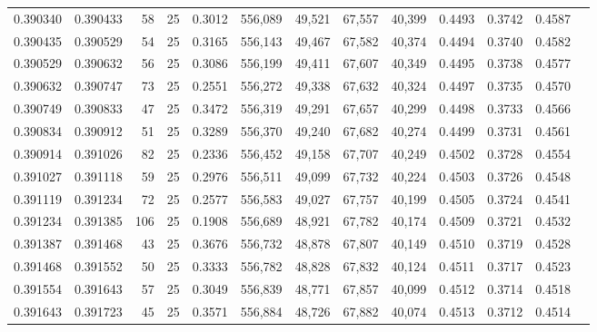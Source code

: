 \begin{tabular}{rrrrrrrrrrrrr}
0.390340 & 0.390433 &    58 &  25 &                                     0.3012 & 556,089 &  49,521 &  67,557 &  40,399 & 0.4493 & 0.3742 & 0.4587 \\
0.390435 & 0.390529 &    54 &  25 &                                     0.3165 & 556,143 &  49,467 &  67,582 &  40,374 & 0.4494 & 0.3740 & 0.4582 \\
0.390529 & 0.390632 &    56 &  25 &                                     0.3086 & 556,199 &  49,411 &  67,607 &  40,349 & 0.4495 & 0.3738 & 0.4577 \\
0.390632 & 0.390747 &    73 &  25 &                                     0.2551 & 556,272 &  49,338 &  67,632 &  40,324 & 0.4497 & 0.3735 & 0.4570 \\
0.390749 & 0.390833 &    47 &  25 &                                     0.3472 & 556,319 &  49,291 &  67,657 &  40,299 & 0.4498 & 0.3733 & 0.4566 \\
0.390834 & 0.390912 &    51 &  25 &                                     0.3289 & 556,370 &  49,240 &  67,682 &  40,274 & 0.4499 & 0.3731 & 0.4561 \\
0.390914 & 0.391026 &    82 &  25 &                                     0.2336 & 556,452 &  49,158 &  67,707 &  40,249 & 0.4502 & 0.3728 & 0.4554 \\
0.391027 & 0.391118 &    59 &  25 &                                     0.2976 & 556,511 &  49,099 &  67,732 &  40,224 & 0.4503 & 0.3726 & 0.4548 \\
0.391119 & 0.391234 &    72 &  25 &                                     0.2577 & 556,583 &  49,027 &  67,757 &  40,199 & 0.4505 & 0.3724 & 0.4541 \\
0.391234 & 0.391385 &   106 &  25 &                                     0.1908 & 556,689 &  48,921 &  67,782 &  40,174 & 0.4509 & 0.3721 & 0.4532 \\
0.391387 & 0.391468 &    43 &  25 &                                     0.3676 & 556,732 &  48,878 &  67,807 &  40,149 & 0.4510 & 0.3719 & 0.4528 \\
0.391468 & 0.391552 &    50 &  25 &                                     0.3333 & 556,782 &  48,828 &  67,832 &  40,124 & 0.4511 & 0.3717 & 0.4523 \\
0.391554 & 0.391643 &    57 &  25 &                                     0.3049 & 556,839 &  48,771 &  67,857 &  40,099 & 0.4512 & 0.3714 & 0.4518 \\
0.391643 & 0.391723 &    45 &  25 &                                     0.3571 & 556,884 &  48,726 &  67,882 &  40,074 & 0.4513 & 0.3712 & 0.4514 \\

\end{tabular}
